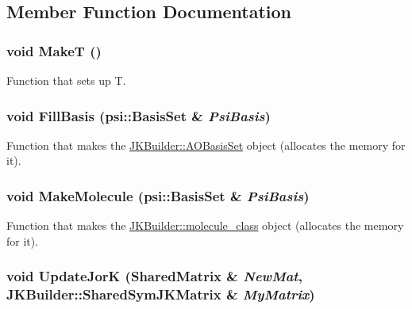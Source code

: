 \subsection{Member Function Documentation}
\hypertarget{classpsi_1_1scf_1_1Psi4JK_a3c559c20a0aa33fa3c6d9bf9e9aefff8}{
\subsubsection[{MakeT}]{\setlength{\rightskip}{0pt plus 5cm}void MakeT ()}}
\label{classpsi_1_1scf_1_1Psi4JK_a3c559c20a0aa33fa3c6d9bf9e9aefff8}


Function that sets up T. \hypertarget{classpsi_1_1scf_1_1Psi4JK_a33ac8f638424d92033ec6a72ffc96d6b}{
\subsubsection[{FillBasis}]{\setlength{\rightskip}{0pt plus 5cm}void FillBasis (psi::BasisSet \& {\em PsiBasis})}}
\label{classpsi_1_1scf_1_1Psi4JK_a33ac8f638424d92033ec6a72ffc96d6b}


Function that makes the \hyperlink{classJKBuilder_1_1AOBasisSet}{JKBuilder::AOBasisSet} object (allocates the memory for it). \hypertarget{classpsi_1_1scf_1_1Psi4JK_a1cd8cf0f476576f25976b4b822230afa}{
\subsubsection[{MakeMolecule}]{\setlength{\rightskip}{0pt plus 5cm}void MakeMolecule (psi::BasisSet \& {\em PsiBasis})}}
\label{classpsi_1_1scf_1_1Psi4JK_a1cd8cf0f476576f25976b4b822230afa}


Function that makes the \hyperlink{classJKBuilder_1_1molecule__class}{JKBuilder::molecule\_\-class} object (allocates the memory for it). \hypertarget{classpsi_1_1scf_1_1Psi4JK_ac2f36c6229344fb608c6d868377a5548}{
\subsubsection[{UpdateJorK}]{\setlength{\rightskip}{0pt plus 5cm}void UpdateJorK ({\bf SharedMatrix} \& {\em NewMat}, \/  {\bf JKBuilder::SharedSymJKMatrix} \& {\em MyMatrix})}}
\label{classpsi_1_1scf_1_1Psi4JK_ac2f36c6229344fb608c6d868377a5548}


